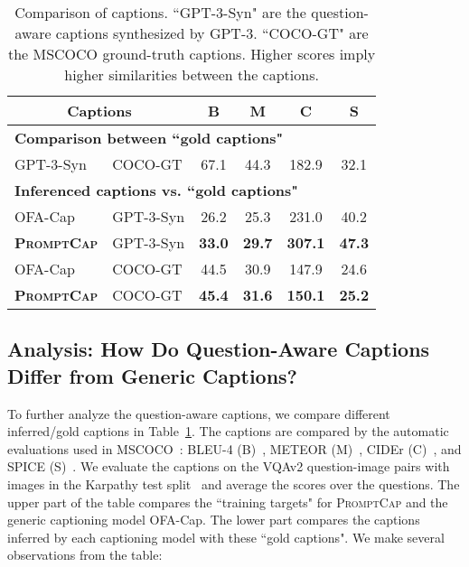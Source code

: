 \documentclass[10pt,twocolumn,letterpaper]{article}
\newcommand{\NAME}{\textsc{PromptCap}\xspace}
\begin{document}
\begin{table}[h]
\small
\centering
\caption{Comparison of captions.
``GPT-3-Syn" are the question-aware captions synthesized by GPT-3.
``COCO-GT" are the MSCOCO ground-truth captions.
Higher scores imply higher similarities between the captions.
}
\begin{tabular}{l|l|cccc}
\toprule[1.2pt]
\multicolumn{2}{c}{Captions} & B & M & C & S\\
\midrule
\multicolumn{6}{l}{\textbf{Comparison between ``gold captions"}}\\
GPT-3-Syn & COCO-GT & 67.1 & 44.3  & 182.9 & 32.1\\
\midrule
\multicolumn{6}{l}{\textbf{Inferenced captions vs. ``gold captions"}}\\
OFA-Cap &  GPT-3-Syn & 26.2 &  25.3  & 231.0  & 40.2\\
\textbf{\NAME} & GPT-3-Syn & \textbf{33.0}  & \textbf{29.7}  & \textbf{307.1} & \textbf{47.3}\\
OFA-Cap & COCO-GT & 44.5 & 30.9 & 147.9 & 24.6\\
\textbf{\NAME} & COCO-GT & \textbf{45.4}  & \textbf{31.6}  & \textbf{150.1} & \textbf{25.2}\\
\bottomrule[1.2pt]
\end{tabular}
\label{tab:captioning}

\vspace{-3mm}
\end{table}
 

\subsection{Analysis: How Do Question-Aware Captions Differ from Generic Captions?}
\label{sec:appendix:captioning}

To further analyze the question-aware captions, we compare different inferred/gold captions in Table~\ref{tab:captioning}.
The captions are compared by the automatic evaluations used in MSCOCO~\cite{chen2015microsoft}: BLEU-4 (B)~\cite{papineni2002bleu}, METEOR (M)~\cite{banerjee2005meteor}, CIDEr (C)~\cite{vedantam2015cider}, and SPICE (S)~\cite{anderson2016spice}.
We evaluate the captions on the VQAv2 question-image pairs with images in  the Karpathy test split~\cite{karpathy2017deep}
and average the scores over the questions.
The upper part of the table compares the ``training targets" for \NAME and the generic captioning model OFA-Cap.
The lower part compares the captions inferred by each captioning model with these ``gold captions".
We make several observations from the table:
\end{document}
